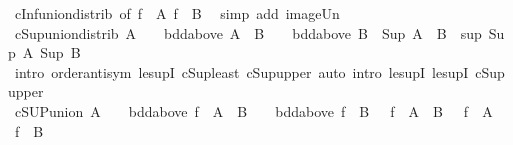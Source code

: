 \begin{isabellebody}
\endisadelimproof
%
\isatagproof
{}\isamarkupfalse%
\ cInf{\isacharunderscore}{\kern0pt}union{\isacharunderscore}{\kern0pt}distrib\ {\isacharbrackleft}{\kern0pt}of\ {\isachardoublequoteopen}f\ {\isacharbackquote}{\kern0pt}\ A{\isachardoublequoteclose}\ {\isachardoublequoteopen}f\ {\isacharbackquote}{\kern0pt}\ B{\isachardoublequoteclose}{\isacharbrackright}{\kern0pt}\ \isamarkupfalse%
\ {\isacharparenleft}{\kern0pt}simp\ add{\isacharcolon}{\kern0pt}\ image{\isacharunderscore}{\kern0pt}Un{\isacharparenright}{\kern0pt}%
\endisatagproof
{\isafoldproof}%
%
\isadelimproof
\isanewline
%
\endisadelimproof
\isanewline
{}\isamarkupfalse%
\ cSup{\isacharunderscore}{\kern0pt}union{\isacharunderscore}{\kern0pt}distrib{\isacharcolon}{\kern0pt}\ {\isachardoublequoteopen}A\ {\isasymnoteq}\ {\isacharbraceleft}{\kern0pt}{\isacharbraceright}{\kern0pt}\ {\isasymLongrightarrow}\ bdd{\isacharunderscore}{\kern0pt}above\ A\ {\isasymLongrightarrow}\ B\ {\isasymnoteq}\ {\isacharbraceleft}{\kern0pt}{\isacharbraceright}{\kern0pt}\ {\isasymLongrightarrow}\ bdd{\isacharunderscore}{\kern0pt}above\ B\ {\isasymLongrightarrow}\ Sup\ {\isacharparenleft}{\kern0pt}A\ {\isasymunion}\ B{\isacharparenright}{\kern0pt}\ {\isacharequal}{\kern0pt}\ sup\ {\isacharparenleft}{\kern0pt}Sup\ A{\isacharparenright}{\kern0pt}\ {\isacharparenleft}{\kern0pt}Sup\ B{\isacharparenright}{\kern0pt}{\isachardoublequoteclose}\isanewline
%
\isadelimproof
\ \ %
\endisadelimproof
%
\isatagproof
{}\isamarkupfalse%
\ {\isacharparenleft}{\kern0pt}intro\ order{\isachardot}{\kern0pt}antisym\ le{\isacharunderscore}{\kern0pt}supI\ cSup{\isacharunderscore}{\kern0pt}least\ cSup{\isacharunderscore}{\kern0pt}upper{\isacharparenright}{\kern0pt}\ {\isacharparenleft}{\kern0pt}auto\ intro{\isacharcolon}{\kern0pt}\ le{\isacharunderscore}{\kern0pt}supI{}\ le{\isacharunderscore}{\kern0pt}supI{}\ cSup{\isacharunderscore}{\kern0pt}upper{\isacharparenright}{\kern0pt}%
\endisatagproof
{\isafoldproof}%
%
\isadelimproof
\isanewline
%
\endisadelimproof
\isanewline
{}\isamarkupfalse%
\ cSUP{\isacharunderscore}{\kern0pt}union{\isacharcolon}{\kern0pt}\ {\isachardoublequoteopen}A\ {\isasymnoteq}\ {\isacharbraceleft}{\kern0pt}{\isacharbraceright}{\kern0pt}\ {\isasymLongrightarrow}\ bdd{\isacharunderscore}{\kern0pt}above\ {\isacharparenleft}{\kern0pt}f\ {\isacharbackquote}{\kern0pt}\ A{\isacharparenright}{\kern0pt}\ {\isasymLongrightarrow}\ B\ {\isasymnoteq}\ {\isacharbraceleft}{\kern0pt}{\isacharbraceright}{\kern0pt}\ {\isasymLongrightarrow}\ bdd{\isacharunderscore}{\kern0pt}above\ {\isacharparenleft}{\kern0pt}f\ {\isacharbackquote}{\kern0pt}\ B{\isacharparenright}{\kern0pt}\ {\isasymLongrightarrow}\ {\isasymSqunion}\ {\isacharparenleft}{\kern0pt}f\ {\isacharbackquote}{\kern0pt}\ {\isacharparenleft}{\kern0pt}A\ {\isasymunion}\ B{\isacharparenright}{\kern0pt}{\isacharparenright}{\kern0pt}\ {\isacharequal}{\kern0pt}\ {\isasymSqunion}\ {\isacharparenleft}{\kern0pt}f\ {\isacharbackquote}{\kern0pt}\ A{\isacharparenright}{\kern0pt}\ {\isasymsqunion}\ {\isasymSqunion}\ {\isacharparenleft}{\kern0pt}f\ {\isacharbackquote}{\kern0pt}\ B{\isacharparenright}{\kern0pt}{\isachardoublequoteclose}\isanewline

\end{isabellebody}
